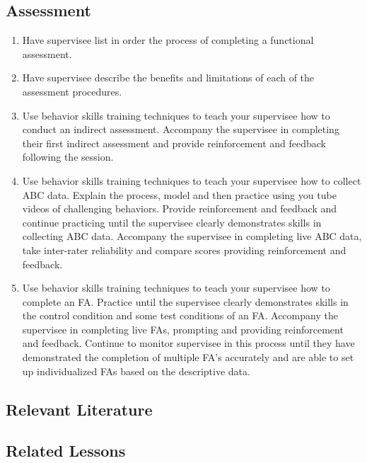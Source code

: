 \subsection{Assessment}
\begin{enumerate}
\item Have supervisee list in order the process of completing a functional assessment.
\item Have supervisee describe the benefits and limitations of each of the assessment procedures.
\item Use behavior skills training techniques to teach your supervisee how to conduct an indirect assessment.  Accompany the supervisee in completing their first indirect assessment and provide reinforcement and feedback following the session.
\item Use behavior skills training techniques to teach your supervisee how to collect ABC data.  Explain the process, model and then practice using you tube videos of challenging behaviors.  Provide reinforcement and feedback and continue practicing until the supervisee clearly demonstrates skills in collecting ABC data.  Accompany the supervisee in completing live ABC data, take inter-rater reliability and compare scores providing reinforcement and feedback.
\item Use behavior skills training techniques to teach your supervisee how to complete an FA. Practice until the supervisee clearly demonstrates skills in the control condition and some test conditions of an FA.  Accompany the supervisee in completing live FAs, prompting and providing reinforcement and feedback.  Continue to monitor supervisee in this process until they have demonstrated the completion of multiple FA's accurately and are able to set up individualized FAs based on the descriptive data.
\end{enumerate}
%
\subsection{Relevant Literature}
\begin{refsection}
\nocite{baer1987some,
        bac2014professional,
        cooper2007applied,
        hanley2003functional,
        iwata1994functions,
        pence2009relative,
        sasso1992use}
\printbibliography[heading=none]
\end{refsection}
%
\subsection{Related Lessons}
\fourbThree{}\\
\fourbFive{}\\
\foureOne{}\\
\fourhOne{}\\
\fourhThree{}\\
\fourhFive{}\\
\fouriThree{}\\
%

